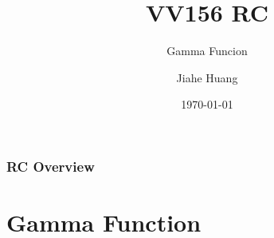 \documentclass[
	11pt, %
]{beamer}
\title{VV156 RC} %
\subtitle{Gamma Funcion} %
\author{Jiahe Huang} %
\institute{UM-SJTU Joint Institute} %
\date{\today} %
\begin{document}

\begin{frame}
	\titlepage %
\end{frame}



\begin{frame}
	\frametitle{RC Overview} %
	
	\tableofcontents %
\end{frame}



\section{Gamma Function}
\begin{frame}
    \transfade
	\tableofcontents[sectionstyle=show/shaded,subsectionstyle=show/shaded]
\end{frame}
\end{document}
